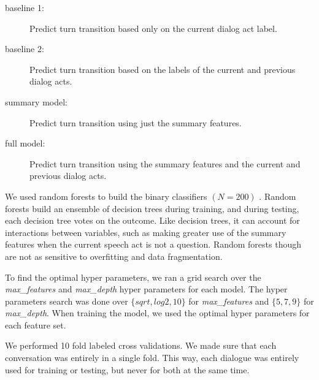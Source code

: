    \begin{description}
        \item[baseline 1:] Predict turn transition based only on the current dialog act label.
        \item[baseline 2:] Predict turn transition based on the labels of the current and previous dialog acts.
        \item[summary model:] Predict turn transition using just the summary features.
        \item[full model:] Predict turn transition using the summary features and the current and previous dialog acts.
    \end{description}


We used random forests to build the binary classifiers $(N=200)$ \cite{Breiman01randomforests}. Random forests build an ensemble of decision trees during training, and during testing, each decision tree votes on the outcome.  Like decision trees, it can account for interactions between variables, such as making greater use of the summary features when the current speech act is not a question.  Random forests though are not as sensitive to overfitting and data fragmentation.

To find the optimal hyper parameters, we ran a grid search over the \textit{max\_features} and \textit{max\_depth} hyper parameters for each model. The hyper parameters search was done over $\{sqrt, log2, 10\}$ for \textit{max\_features} and $\{5, 7, 9\}$ for \textit{max\_depth}. When training the model, we used the optimal hyper parameters for each feature set.

   We performed 10 fold labeled cross validations.  We made sure that each conversation was entirely in a single fold. This way, each dialogue was entirely used for training or testing, but never for both at the same time.
